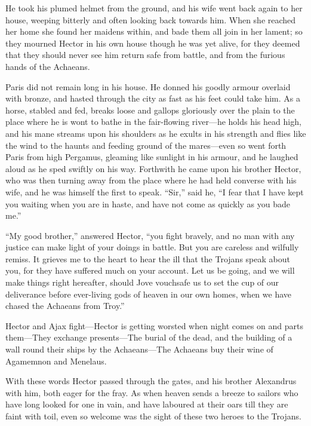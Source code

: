 He took his plumed helmet from the ground, and his wife went back again to
her house, weeping bitterly and often looking back towards him. When she
reached her home she found her maidens within, and bade them all join in
her lament; so they mourned Hector in his own house though he was yet
alive, for they deemed that they should never see him return safe from
battle, and from the furious hands of the Achaeans.

Paris did not remain long in his house. He donned his goodly armour
overlaid with bronze, and hasted through the city as fast as his feet
could take him. As a horse, stabled and fed, breaks loose and gallops
gloriously over the plain to the place where he is wont to bathe in the
fair-flowing river—he holds his head high, and his mane streams upon
his shoulders as he exults in his strength and flies like the wind to the
haunts and feeding ground of the mares—even so went forth Paris from
high Pergamus, gleaming like sunlight in his armour, and he laughed aloud
as he sped swiftly on his way. Forthwith he came upon his brother Hector,
who was then turning away from the place where he had held converse with
his wife, and he was himself the first to speak. “Sir,” said he, “I fear
that I have kept you waiting when you are in haste, and have not come as
quickly as you bade me.”

“My good brother,” answered Hector, “you fight bravely, and no man with
any justice can make light of your doings in battle. But you are careless
and wilfully remiss. It grieves me to the heart to hear the ill that the
Trojans speak about you, for they have suffered much on your account. Let
us be going, and we will make things right hereafter, should Jove
vouchsafe us to set the cup of our deliverance before ever-living gods of
heaven in our own homes, when we have chased the Achaeans from Troy.”


Hector and Ajax fight—Hector is getting worsted when night comes on
and parts them—They exchange presents—The burial of the dead,
and the building of a wall round their ships by the Achaeans—The
Achaeans buy their wine of Agamemnon and Menelaus.

With these words Hector passed through the gates, and his brother
Alexandrus with him, both eager for the fray. As when heaven sends a
breeze to sailors who have long looked for one in vain, and have laboured
at their oars till they are faint with toil, even so welcome was the sight
of these two heroes to the Trojans.

